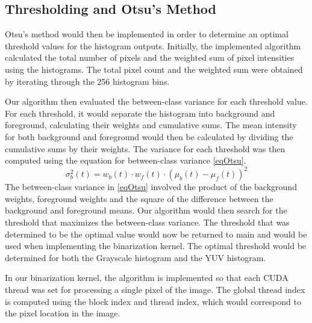 \documentclass[conference]{IEEEtran}
\begin{document}
      \subsection{Thresholding and Otsu's Method}
         Otsu's method would then be implemented in order to determine an optimal threshold values for the histogram outputs. Initially, the implemented algorithm calculated the total number of pixels and the weighted sum of pixel intensities using the histograms. The total pixel count and the weighted sum were obtained by iterating through the 256 histogram bins.

         Our algorithm then evaluated the between-class variance for each threshold value. For each threshold, it would separate the histogram into background and foreground, calculating their weights and cumulative sums. The mean intensity for both background and foreground would then be calculated by dividing the cumulative sums by their weights. The variance for each threshold was then computed using the equation for between-class variance \eqref{eqOtsu}.
         \begin{equation}\label{eqOtsu}
         	\sigma^2_b(t) = w_b(t) \cdot w_f(t) \cdot (\mu_b(t) - \mu_f(t))^2
         \end{equation}
         The between-class variance in \eqref{eqOtsu} involved the product of the background weights, foreground weights and the square of the difference between the background and foreground means. Our algorithm would then search for the threshold that maximizes the between-class variance. The threshold that was determined to be the optimal value would now be returned to main and would be used when implementing the binarization kernel. The optimal threshold would be determined for both the Grayscale histogram and the YUV histogram.

         In our binarization kernel, the algorithm is implemented so that each CUDA thread was set for processing a single pixel of the image. The global thread index is computed using the block index and thread index, which would correspond to the pixel location in the image.
\end{document}
